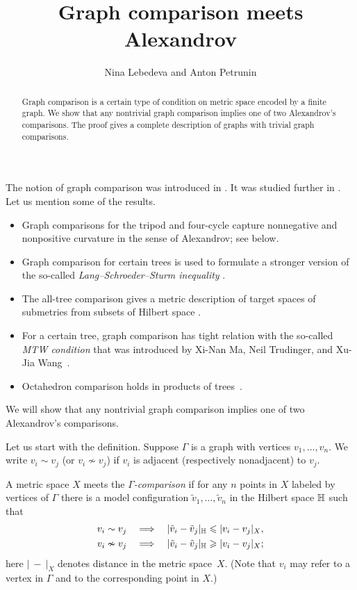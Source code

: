 \documentclass{article}
\def\thetitle{Graph comparison meets Alexandrov}
\def\theauthors{Nina Lebedeva and Anton Petrunin}
\begin{document}


\title{\thetitle}
\author{\theauthors}

\date{}
\maketitle
\begin{abstract}
Graph comparison is a certain type of condition on metric space encoded by a finite graph.
We show that any nontrivial graph comparison implies one of two Alexandrov's comparisons.
The proof gives a complete description of graphs with trivial graph comparisons.
\end{abstract}

The notion of graph comparison was introduced in \cite{lebedeva-petrunin-zolotov}.
It was studied further in \cite{toyoda,toyoda2019,lebedeva-petrunin-CBB,lebedeva,lebedeva-petrunin,lebedeva-petrunin-octahedron}.
Let us mention some of the results.
\begin{itemize}
\item Graph comparisons for the tripod and four-cycle capture nonnegative and nonpositive curvature in the sense of Alexandrov; see below.
\item Graph comparison for certain trees is used to formulate a stronger version of the so-called \emph{Lang--Schroeder--Sturm inequality} \cite{lang-schroeder, sturm, lebedeva-petrunin-CBB}.
\item The all-tree comparison gives a metric description of target spaces of submetries from subsets of Hilbert space \cite{lebedeva-petrunin-zolotov}.
\item For a certain tree, graph comparison has tight relation with the so-called \emph{MTW condition} that was introduced by Xi-Nan Ma, Neil Trudinger, and Xu-Jia Wang~\cite{lebedeva-petrunin-zolotov,ma-trudinger-wang}.
\item Octahedron comparison holds in products of trees~\cite{lebedeva-petrunin-octahedron}.
\end{itemize}
We will show that any nontrivial graph comparison implies one of two Alexandrov's comparisons.

Let us start with the definition.
Suppose $\Gamma$ is a graph with vertices $v_1,\dots,v_n$.
We write $v_i\sim v_j$ (or $v_i\nsim v_j$) if $v_i$ is adjacent (respectively nonadjacent) to $v_j$.

A metric space $X$ meets the \emph{$\Gamma$-comparison} if for any $n$ points in $X$ labeled by vertices of $\Gamma$ there is a model configuration $\tilde v_1,\dots,\tilde v_n$ in the Hilbert space $\mathbb H$ such that 
\begin{align*}
v_i\sim v_j\quad&\Longrightarrow\quad|\tilde v_i-\tilde v_j|_{\mathbb H}\leqslant | v_i-v_j|_{X},
\\
v_i\nsim v_j\quad&\Longrightarrow\quad|\tilde v_i-\tilde v_j|_{\mathbb H}\geqslant | v_i-v_j|_{X};
\end{align*}
here $|\ -\ |_X$ denotes distance in the metric space~$X$.
(Note that $v_i$ may refer to a vertex in $\Gamma$ and to the corresponding point in $X$.)
\end{document}
